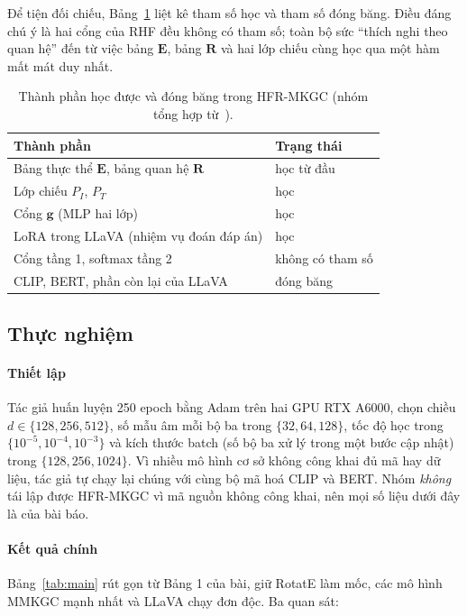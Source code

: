 \documentclass[conference,a4paper]{IEEEtran}
\begin{document}
Để tiện đối chiếu, Bảng~\ref{tab:params} liệt kê tham số học và tham số đóng băng. Điều đáng chú ý là hai cổng của RHF đều không có tham số; toàn bộ sức ``thích nghi theo quan hệ'' đến từ việc bảng $\mathbf{E}$, bảng $\mathbf{R}$ và hai lớp chiếu cùng học qua một hàm mất mát duy nhất.

\begin{table}[t]
\centering
\caption{Thành phần học được và đóng băng trong HFR-MKGC (nhóm tổng hợp từ~\cite{hfrmkgc}).}
\label{tab:params}
\footnotesize
\begin{tabular}{l l}
\toprule
Thành phần & Trạng thái\\
\midrule
Bảng thực thể $\mathbf{E}$, bảng quan hệ $\mathbf{R}$ & học từ đầu\\
Lớp chiếu $P_I$, $P_T$ & học\\
Cổng $\mathbf{g}$ (MLP hai lớp) & học\\
LoRA trong LLaVA (nhiệm vụ đoán đáp án) & học\\
Cổng tầng 1, softmax tầng 2 & không có tham số\\
CLIP, BERT, phần còn lại của LLaVA & đóng băng\\
\bottomrule
\end{tabular}
\end{table}

\subsection{Thực nghiệm}
\label{sec:hfr-exp}

\paragraph{Thiết lập} Tác giả huấn luyện 250 epoch bằng Adam trên hai GPU RTX A6000, chọn chiều $d \in \{128, 256, 512\}$, số mẫu âm mỗi bộ ba trong $\{32, 64, 128\}$, tốc độ học trong $\{10^{-5}, 10^{-4}, 10^{-3}\}$ và kích thước batch (số bộ ba xử lý trong một bước cập nhật) trong $\{128, 256, 1024\}$. Vì nhiều mô hình cơ sở không công khai đủ mã hay dữ liệu, tác giả tự chạy lại chúng với cùng bộ mã hoá CLIP và BERT. Nhóm \emph{không} tái lập được HFR-MKGC vì mã nguồn không công khai, nên mọi số liệu dưới đây là của bài báo.

\paragraph{Kết quả chính} Bảng~\ref{tab:main} rút gọn từ Bảng 1 của bài, giữ RotatE làm mốc, các mô hình MMKGC mạnh nhất và LLaVA chạy đơn độc. Ba quan sát:
\end{document}
